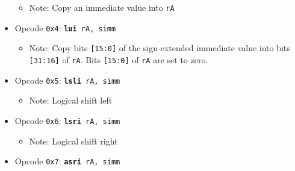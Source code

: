 \documentclass{article}
\begin{document}
\begin{itemize}
\begin{itemize}
			\item Note:  Copy an immediate value into \texttt{rA}
		\end{itemize}
		\item Opcode \texttt{0x4}:
			\texttt{\textbf{lui} rA, simm}
		\begin{itemize}
			\item Note:  Copy bits \texttt{[15:0]} of the sign-extended
			immediate value into bits \texttt{[31:16]} of \texttt{rA}.
			Bits \texttt{[15:0]} of \texttt{rA} are set to zero.
		\end{itemize}
		\item Opcode \texttt{0x5}:
			\texttt{\textbf{lsli} rA, simm}
		\begin{itemize}
			\item Note:  Logical shift left
		\end{itemize}
		\item Opcode \texttt{0x6}:
			\texttt{\textbf{lsri} rA, simm}
		\begin{itemize}
			\item Note:  Logical shift right
		\end{itemize}
		\item Opcode \texttt{0x7}:
			\texttt{\textbf{asri} rA, simm}
		\begin{itemize}

\end{itemize}
\end{itemize}
\end{document}
